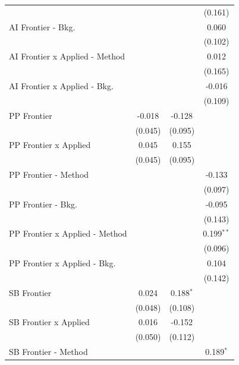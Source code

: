 \begin{tabular}{lccc}
                                  &         &             & (0.161)\\   
   AI Frontier - Bkg.             &         &             & 0.060\\   
                                  &         &             & (0.102)\\   
   AI Frontier x Applied - Method &         &             & 0.012\\   
                                  &         &             & (0.165)\\   
   AI Frontier x Applied - Bkg.   &         &             & -0.016\\   
                                  &         &             & (0.109)\\   
   PP Frontier                    & -0.018  & -0.128      &   \\   
                                  & (0.045) & (0.095)     &   \\   
   PP Frontier x Applied          & 0.045   & 0.155       &   \\   
                                  & (0.045) & (0.095)     &   \\   
   PP Frontier - Method           &         &             & -0.133\\   
                                  &         &             & (0.097)\\   
   PP Frontier - Bkg.             &         &             & -0.095\\   
                                  &         &             & (0.143)\\   
   PP Frontier x Applied - Method &         &             & 0.199$^{**}$\\   
                                  &         &             & (0.096)\\   
   PP Frontier x Applied - Bkg.   &         &             & 0.104\\   
                                  &         &             & (0.142)\\   
   SB Frontier                    & 0.024   & 0.188$^{*}$ &   \\   
                                  & (0.048) & (0.108)     &   \\   
   SB Frontier x Applied          & 0.016   & -0.152      &   \\   
                                  & (0.050) & (0.112)     &   \\   
   SB Frontier - Method           &         &             & 0.189$^{*}$\\   

\end{tabular}
